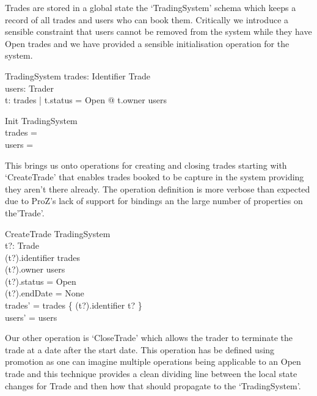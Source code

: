 \documentclass{article}
\begin{document}
\hspace{-0.7cm} Trades are stored in a global state the ‘TradingSystem’ schema which keeps a record of all trades and users who can book them. Critically we introduce a sensible constraint that users cannot be removed from the system while they have Open trades and we have provided a sensible initialisation operation for the system.

\begin{schema}{TradingSystem}
trades: Identifier \pfun Trade \\
users: \finset Trader \\
\where
\forall t: \ran trades | t.status = Open @ t.owner \in users \\ 
\end{schema}

\begin{schema}{Init}
TradingSystem \\
\where
trades = \emptyset \\
users = \emptyset \\
\end{schema}

\hspace{-0.7cm} This brings us onto operations for creating and closing trades starting with ‘CreateTrade’ that enables trades booked to be capture in the system providing they aren’t there already. The operation definition is more verbose than expected due to ProZ’s lack of support for bindings an the large number of properties on the’Trade’.

\begin{schema}{CreateTrade}
\Delta TradingSystem \\
t?: Trade \\
\where 
(t?).identifier \notin \dom trades \\
(t?).owner \in users \\
(t?).status = Open \\ 
(t?).endDate = None \\
trades' = trades \cup \{ (t?).identifier \mapsto t? \} \\
users' = users \\
\end{schema}

Our other operation is ‘CloseTrade’ which allows the trader to terminate the trade at a date after the start date. This operation has be defined using promotion as one can imagine multiple operations being applicable to an Open trade and this technique provides a clean dividing line between the local state changes for Trade and then how that should propagate to the ‘TradingSystem’.
\end{document}
